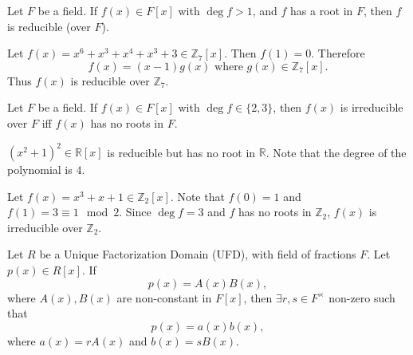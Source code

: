 \documentclass[notoc,notitlepage]{tufte-book}
\begin{document}
\begin{propo}\label{propo:polynomials_with_roots_are_reducible}
  Let $F$ be a field. If $f(x) \in F[x]$ with $\deg f > 1$, and $f$ has a root in $F$,
  then $f$ is reducible (over $F$).
\end{propo}

\begin{eg}
  Let $f(x) = x^6 + x^3 + x^4 + x^3 + 3 \in \mathbb{Z}_7[x]$. Then $f(1) = 0$.
  Therefore
  \begin{equation*}
    f(x) = (x - 1) g(x) \text{ where } g(x) \in \mathbb{Z}_7[x].
  \end{equation*}
  Thus $f(x)$ is reducible over $\mathbb{Z}_7$.
\end{eg}

\begin{propo}\label{propo:irreducible_rootless_polynomials}
  Let $F$ be a field. If $f(x) \in F[x]$ with $\deg f \in \{ 2, 3 \}$, then $f(x)$ is irreducible over $F$
  iff $f(x)$ has no roots in $F$.
\end{propo}

\begin{warning}
  $(x^2 + 1)^2 \in \mathbb{R}[x]$ is reducible but has no root in $\mathbb{R}$. Note that
  the degree of the polynomial is $4$.
\end{warning}

\begin{eg}
  Let $f(x) = x^3 + x + 1 \in \mathbb{Z}_2[x]$. Note that $f(0) = 1$ and 
  $f(1) = 3 \equiv 1 \mod 2$. Since $\deg f = 3$ and $f$ has no roots in $\mathbb{Z}_2$,
  $f(x)$ is irreducible over $\mathbb{Z}_2$.
\end{eg}

\begin{thm}\label{thm:gauss_lemma}
  Let $R$ be a Unique Factorization Domain (UFD), with field of fractions $F$.
  Let $p(x) \in R[x]$. If
  \begin{equation*}
    p(x) = A(x) B(x),
  \end{equation*}
  where $A(x), B(x)$ are non-constant in $F[x]$, then 
  $\exists r, s \in F^\times$ non-zero such that
  \begin{equation*}
    p(x) = a(x) b(x),
  \end{equation*}
  where $a(x) = rA(x)$ and $b(x) = sB(x)$.
\end{thm}
\end{document}
